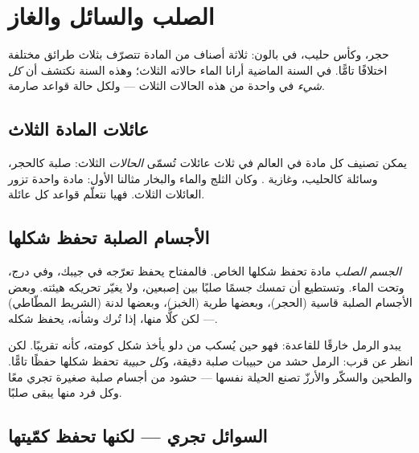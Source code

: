 \chapter{الصلب والسائل والغاز}\label{ch:g3:solids-liquids-gases}

حجر، وكأس حليب،  في بالون: ثلاثة أصناف من المادة تتصرّف
بثلاث طرائق مختلفة اختلافًا تامًّا. في السنة الماضية أرانا الماء
حالاته الثلاث؛ وهذه السنة نكتشف أن \emph{كل شيء} في واحدة من هذه
الحالات الثلاث --- ولكل حالة قواعد صارمة.

\section{عائلات المادة الثلاث}

يمكن تصنيف كل مادة في العالم في ثلاث عائلات تُسمّى \emph{الحالات}
الثلاث: صلبة كالحجر، وسائلة كالحليب، وغازية . وكان الثلج
والماء والبخار مثالنا الأول: مادة واحدة تزور العائلات الثلاث. فهيا
نتعلّم قواعد كل عائلة.

\section{الأجسام الصلبة تحفظ شكلها}

\begin{definition}\label{def:g3:solids-liquids-gases:solid}
\emph{الجسم الصلب} مادة تحفظ شكلها الخاص. فالمفتاح
يحفظ تعرّجه في جيبك، وفي درج، وتحت الماء. وتستطيع أن تمسك جسمًا
صلبًا بين إصبعين، ولا يغيّر تحريكه هيئته. وبعض الأجسام الصلبة
قاسية (الحجر)، وبعضها طرية (الخبز)، وبعضها لدنة (الشريط
المطّاطي) --- لكن كلًّا منها، إذا تُرك وشأنه، يحفظ شكله.
\end{definition}

\begin{example}\label{ex:g3:solids-liquids-gases:sand}
يبدو الرمل خارقًا للقاعدة: فهو حين يُسكب من دلو يأخذ شكل كومته،
كأنه  تقريبًا. لكن انظر عن قرب: الرمل حشد من حبيبات صلبة
دقيقة، و\emph{كل حبيبة} تحفظ شكلها حفظًا تامًّا. والطحين والسكّر
والأرزّ تصنع الحيلة نفسها --- حشود من أجسام صلبة صغيرة تجري معًا
وكل فرد منها يبقى صلبًا.
\end{example}

\section{السوائل تجري --- لكنها تحفظ كمّيتها}

